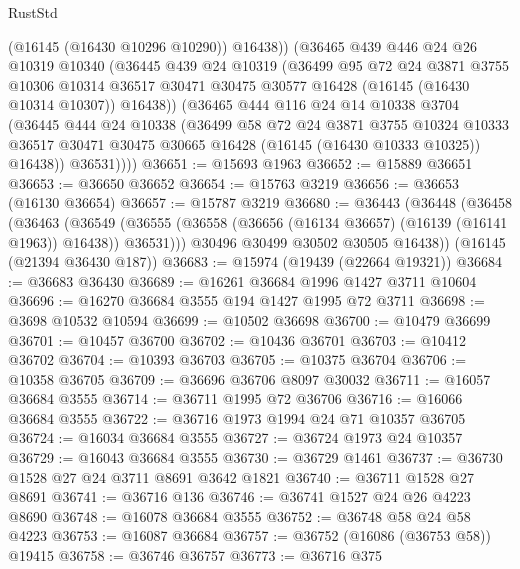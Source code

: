 \begin{lexlean}{RustStd}
\begin{coremodule}
            (@16145 (@16430 @10296 @10290))
            @16438))
        (@36465
          @439
          @446
          @24
          @26
          @10319
          @10340
          (@36445
            @439
            @24
            @10319
            (@36499
              @95
              @72
              @24
              @3871
              @3755
              @10306
              @10314
              @36517
              @30471
              @30475
              @30577
              @16428
              (@16145 (@16430 @10314 @10307))
              @16438))
          (@36465
            @444
            @116
            @24
            @14
            @10338
            @3704
            (@36445
              @444
              @24
              @10338
              (@36499
                @58
                @72
                @24
                @3871
                @3755
                @10324
                @10333
                @36517
                @30471
                @30475
                @30665
                @16428
                (@16145 (@16430 @10333 @10325))
                @16438))
            @36531))))
@36651 := @15693 @1963
@36652 := @15889 @36651
@36653 := @36650 @36652
@36654 := @15763 @3219
@36656 := @36653 (@16130 @36654)
@36657 := @15787 @3219
@36680 := @36443
    (@36448
      (@36458
        (@36463
          (@36549 (@36555 (@36558 (@36656 (@16134 @36657) (@16139 (@16141 @1963)) @16438)) @36531)))
        @30496
        @30499
        @30502
        @30505
        @16438))
    (@16145 (@21394 @36430 @187))
@36683 := @15974 (@19439 (@22664 @19321))
@36684 := @36683 @36430
@36689 := @16261 @36684 @1996 @1427 @3711 @10604
@36696 := @16270 @36684 @3555 @194 @1427 @1995 @72 @3711
@36698 := @3698 @10532 @10594
@36699 := @10502 @36698
@36700 := @10479 @36699
@36701 := @10457 @36700
@36702 := @10436 @36701
@36703 := @10412 @36702
@36704 := @10393 @36703
@36705 := @10375 @36704
@36706 := @10358 @36705
@36709 := @36696 @36706 @8097 @30032
@36711 := @16057 @36684 @3555
@36714 := @36711 @1995 @72 @36706
@36716 := @16066 @36684 @3555
@36722 := @36716 @1973 @1994 @24 @71 @10357 @36705
@36724 := @16034 @36684 @3555
@36727 := @36724 @1973 @24 @10357
@36729 := @16043 @36684 @3555
@36730 := @36729 @1461
@36737 := @36730 @1528 @27 @24 @3711 @8691 @3642 @1821
@36740 := @36711 @1528 @27 @8691
@36741 := @36716 @136
@36746 := @36741 @1527 @24 @26 @4223 @8690
@36748 := @16078 @36684 @3555
@36752 := @36748 @58 @24 @58 @4223
@36753 := @16087 @36684
@36757 := @36752 (@16086 (@36753 @58)) @19415
@36758 := @36746 @36757
@36773 := @36716
    @375

\end{coremodule}
\end{lexlean}
